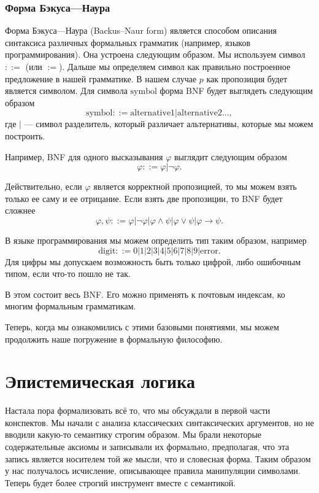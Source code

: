 \documentclass[openany]{book}
\theoremstyle{plain}
\theoremstyle{definition}
\begin{document}
\subsection{Форма Бэкуса---Наура}

Форма Бэкуса---Наура (Backus–Naur form) является способом описания синтаксиса различных формальных грамматик (например, языков программирования). Она устроена следующим образом. Мы используем символ \(::=\) (или \(:=\)). Дальше мы определяем символ как правильно построенное предложение в нашей грамматике. В нашем случае \(p\) как пропозиция будет является символом. Для символа \(\mathrm{symbol}\) форма BNF будет выглядеть следующим образом \[\mathrm{symbol} ::= \mathrm{alternative1} | \mathrm{alternative2} ...,\]
где \(|\) --- символ разделитель, который различает альтернативы, которые мы можем построить.

Например, BNF для одного высказывания \(\varphi\) выглядит следующим образом \[\varphi ::= \varphi | \neg \varphi.\]

Действительно, если \(\varphi\) является корректной пропозицией, то мы можем взять только ее саму и ее отрицание. Если взять две пропозиции, то BNF будет сложнее \[\varphi, \psi ::= \varphi | \neg \varphi | \varphi \land \psi | \varphi \lor \psi | \varphi \to \psi. \]

В языке программирования мы можем определить тип таким образом, например \[\mathrm{digit} ::= 0 | 1 | 2 | 3 | 4 | 5 | 6 | 7 | 8 | 9 | \mathrm{error}.\] Для цифры мы допускаем возможность быть только цифрой, либо ошибочным типом, если что-то пошло не так.

В этом состоит весь BNF. Его можно применять к почтовым индексам, ко многим формальным грамматикам.

Теперь, когда мы ознакомились с этими базовыми понятиями, мы можем продолжить наше погружение в формальную философию.

\chapter{Эпистемическая логика}

Настала пора формализовать всё то, что мы обсуждали в первой части конспектов. Мы начали с анализа классических синтаксических аргументов, но не вводили какую-то семантику строгим образом. Мы брали некоторые содержательные аксиомы и записывали их формально, предполагая, что эта запись является носителем той же мысли, что и словесная форма. Таким образом у нас получалось исчисление, описывающее правила манипуляции символами. Теперь будет более строгий инструмент вместе с семантикой.
\end{document}
